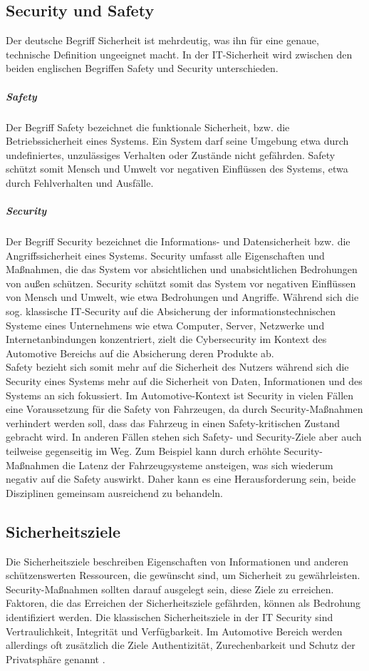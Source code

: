 \subsection{Security und Safety}
Der deutsche Begriff \glqq Sicherheit\grqq{} ist mehrdeutig, was ihn für eine genaue, technische Definition ungeeignet macht. In der IT-Sicherheit wird zwischen den beiden englischen Begriffen \glqq Safety\grqq{} und \glqq Security\grqq{} unterschieden.
\subparagraph{Safety}
\glqq Der Begriff Safety bezeichnet die funktionale Sicherheit, bzw. die Betriebssicherheit eines Systems. Ein System darf seine Umgebung etwa durch undefiniertes, unzulässiges Verhalten oder Zustände nicht gefährden. Safety schützt somit Mensch und Umwelt vor negativen Einflüssen des Systems, etwa durch Fehlverhalten und Ausfälle.\grqq{} \cite[2]{Wurm.2022}
\subparagraph{Security}
\glqq Der Begriff Security bezeichnet die Informations- und Datensicherheit bzw. die Angriffssicherheit eines Systems. Security umfasst alle Eigenschaften und Maßnahmen, die das System vor absichtlichen und unabsichtlichen Bedrohungen
von außen schützen. Security schützt somit das System vor negativen Einflüssen von Mensch und Umwelt, wie etwa Bedrohungen und Angriffe. Während sich die sog. klassische IT-Security auf die Absicherung der informationstechnischen Systeme eines Unternehmens wie etwa Computer, Server, Netzwerke und Internetanbindungen konzentriert, zielt die Cybersecurity im Kontext des Automotive Bereichs auf die Absicherung deren Produkte ab.\grqq{} \cite[2\psq]{Wurm.2022}\\

Safety bezieht sich somit mehr auf die Sicherheit des Nutzers während sich die Security eines Systems mehr auf die Sicherheit von Daten, Informationen und des Systems an sich fokussiert. Im Automotive-Kontext ist Security in vielen Fällen eine Voraussetzung für die Safety von Fahrzeugen, da durch Security-Maßnahmen verhindert werden soll, dass das Fahrzeug in einen Safety-kritischen Zustand gebracht wird. In anderen Fällen stehen sich Safety- und Security-Ziele aber auch teilweise gegenseitig im Weg. Zum Beispiel kann durch erhöhte Security-Maßnahmen die Latenz der Fahrzeugsysteme ansteigen, was sich wiederum negativ auf die Safety auswirkt. Daher kann es eine Herausforderung sein, beide Disziplinen gemeinsam ausreichend zu behandeln.

\subsection{Sicherheitsziele}\label{Sicherheitsziele}
Die Sicherheitsziele beschreiben Eigenschaften von Informationen und anderen schützenswerten Ressourcen, die gewünscht sind, um Sicherheit zu gewährleisten. Security-Maßnahmen sollten darauf ausgelegt sein, diese Ziele zu erreichen. Faktoren, die das Erreichen der Sicherheitsziele gefährden, können als Bedrohung identifiziert werden. Die klassischen Sicherheitsziele in der IT Security sind Vertraulichkeit, Integrität und Verfügbarkeit. Im Automotive Bereich werden allerdings oft zusätzlich die Ziele Authentizität, Zurechenbarkeit und Schutz der Privatsphäre genannt \cite[6]{Wurm.2022}.

